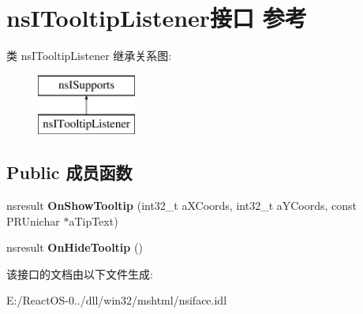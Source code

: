 \hypertarget{interfacens_i_tooltip_listener}{}\section{ns\+I\+Tooltip\+Listener接口 参考}
\label{interfacens_i_tooltip_listener}
类 ns\+I\+Tooltip\+Listener 继承关系图\+:\begin{figure}[H]
\begin{center}
\leavevmode
\includegraphics[height=2.000000cm]{interfacens_i_tooltip_listener}
\end{center}
\end{figure}
\subsection*{Public 成员函数}
\begin{DoxyCompactItemize}
\item 
\mbox{\label{interfacens_i_tooltip_listener_a4b91d8a07c18ff4351789c7acc910bd9}} 
nsresult {\bfseries On\+Show\+Tooltip} (int32\+\_\+t a\+X\+Coords, int32\+\_\+t a\+Y\+Coords, const P\+R\+Unichar $\ast$a\+Tip\+Text)
\item 
\mbox{\label{interfacens_i_tooltip_listener_a2fd8125585959b3d79421929380427eb}} 
nsresult {\bfseries On\+Hide\+Tooltip} ()
\end{DoxyCompactItemize}


该接口的文档由以下文件生成\+:\begin{DoxyCompactItemize}
\item 
E\+:/\+React\+O\+S-\/0../dll/win32/mshtml/nsiface.\+idl\end{DoxyCompactItemize}
